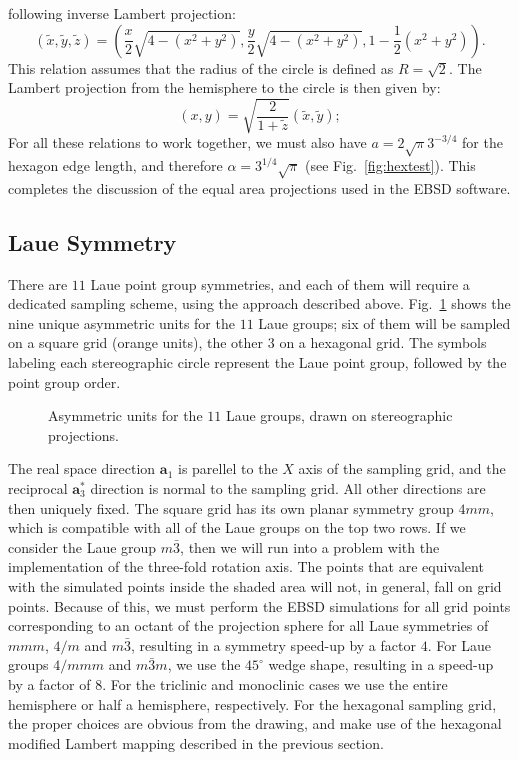 \documentclass[DIV=calc, paper=letter, fontsize=11pt]{scrartcl}	 %
\begin{document}
following inverse Lambert projection:
\begin{equation}
 (\widetilde{x},\widetilde{y},\widetilde{z}) =
\left(\frac{x}{2}\sqrt{4-(x^2+y^2)} ,\frac{y}{2}\sqrt{4-(x^2+y^2)}, 1-\frac{1}{2}(x^2+y^2)\right).\label{eq:lama}
\end{equation}
This relation assumes that the radius of the circle is defined as $R=\sqrt{2}$.
The Lambert projection from the hemisphere to the circle is then given by:
\begin{equation}
    (x,y) = \sqrt{\frac{2}{1+\widetilde{z}}} \left(\widetilde{x},\widetilde{y} \right);\label{eq:lamb}
\end{equation}
For all these relations to work together, we must also have $a=2\sqrt \pi 3^{-3/4}$ for the hexagon edge
length, and therefore $\alpha=3^{1/4}\sqrt{\pi}$ (see Fig.~\ref{fig:hextest}).  This completes the discussion 
of the equal area projections used in the EBSD software.

\subsection{Laue Symmetry \label{sec:Laue}}

There are $11$ Laue point group symmetries, and each of them will require a dedicated sampling scheme, using the approach described above.
Fig.~\ref{fig:Laue-hemispheres} shows the nine unique asymmetric units for the $11$ Laue groups; six of them will be sampled on a square grid 
(orange units), the other $3$ on a hexagonal grid.  The symbols labeling each stereographic circle represent the Laue point group,
followed by the point group order.  

\begin{figure}[t]
\centering\leavevmode
{}
\caption{\label{fig:Laue-hemispheres}Asymmetric units for the $11$ Laue groups, drawn on stereographic projections.}
\end{figure}

The real space direction $\mathbf{a}_1$ is parellel to the $X$ axis of the sampling grid, and the reciprocal $\mathbf{a}_3^{\ast}$ direction
is normal to the sampling grid.  All other directions are then uniquely fixed.  The square grid has its own planar symmetry group $4mm$,
which is compatible with all of the Laue groups on the top two rows.  If we consider the Laue group $m\bar{3}$, then 
we will run into a problem with the implementation of the three-fold rotation axis.  The points that are equivalent with the simulated points
inside the shaded area will not, in general, fall on grid points.  Because of this, we must perform the EBSD simulations for all grid points
corresponding to an octant of the projection sphere for all Laue symmetries of $mmm$, $4/m$ and $m\bar{3}$, resulting in a symmetry speed-up by a factor $4$.  For Laue groups 
$4/mmm$ and $m\bar{3}m$, we use the $45^{\circ}$ wedge shape, resulting in a speed-up by a factor of $8$.  For the triclinic and monoclinic cases we use the entire hemisphere
or half a hemisphere, respectively.
For the hexagonal sampling grid, the proper choices are obvious from the drawing, and make use of the hexagonal modified Lambert mapping described
in the previous section.
\end{document}
